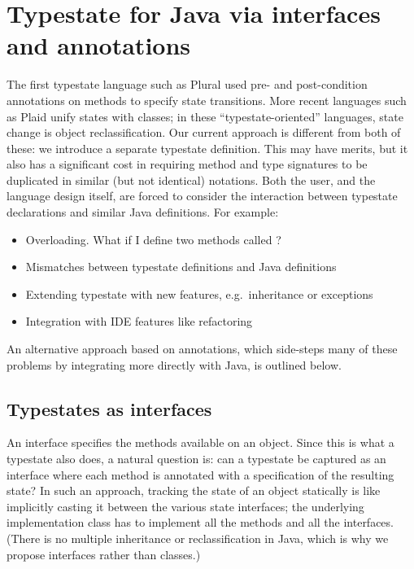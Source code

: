 \section{Typestate for Java via interfaces and annotations}

The first typestate language such as Plural \cite{bierhoff11} used
pre- and post-condition annotations on methods to specify state
transitions. More recent languages such as Plaid \cite{garcia14} unify
states with classes; in these ``typestate-oriented'' languages, state
change is object reclassification. Our current approach is different
from both of these: we introduce a separate typestate definition. This
may have merits, but it also has a significant cost in requiring
method and type signatures to be duplicated in similar (but not
identical) notations. Both the user, and the language design itself,
are forced to consider the interaction between typestate declarations
and similar Java definitions. For example:

\begin{itemize}
\item Overloading. What if I define two methods called ?
\item Mismatches between typestate definitions and Java definitions
\item Extending typestate with new features, e.g.~inheritance or
  exceptions
\item Integration with IDE features like refactoring
\end{itemize}

\noindent An alternative approach based on annotations, which
side-steps many of these problems by integrating more directly with
Java, is outlined below.

\subsection{Typestates as interfaces}

An interface specifies the methods available on an object. Since this
is what a typestate also does, a natural question is: can a typestate
be captured as an interface where each method is annotated with a
specification of the resulting state? In such an approach, tracking
the state of an object statically is like implicitly casting it
between the various state interfaces; the underlying implementation
class has to implement all the methods and all the interfaces. (There
is no multiple inheritance or reclassification in Java, which is why
we propose interfaces rather than classes.)

